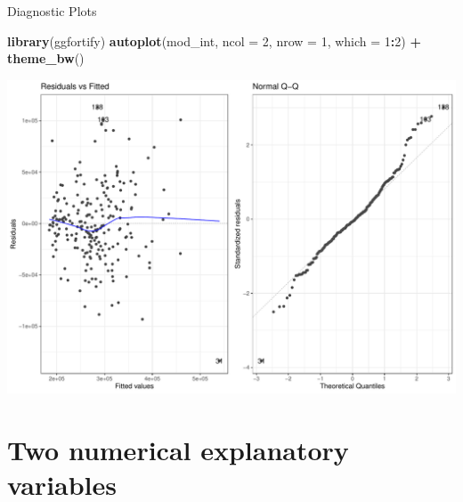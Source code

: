 \documentclass[
  ignorenonframetext,
]{beamer}
\newenvironment{Shaded}{\begin{snugshade}}{\end{snugshade}}
\newcommand{\AttributeTok}[1]{\textcolor[rgb]{0.13,0.29,0.53}{#1}}
\newcommand{\DecValTok}[1]{\textcolor[rgb]{0.00,0.00,0.81}{#1}}
\newcommand{\FunctionTok}[1]{\textcolor[rgb]{0.13,0.29,0.53}{\textbf{#1}}}
\newcommand{\NormalTok}[1]{#1}
\newcommand{\SpecialCharTok}[1]{\textcolor[rgb]{0.81,0.36,0.00}{\textbf{#1}}}
\begin{document}
\begin{frame}[fragile]{Diagnostic Plots}
\protect\hypertarget{diagnostic-plots}{}
\small

\begin{Shaded}
\begin{Highlighting}[]
\FunctionTok{library}\NormalTok{(ggfortify)}
\FunctionTok{autoplot}\NormalTok{(mod\_int, }\AttributeTok{ncol =} \DecValTok{2}\NormalTok{, }\AttributeTok{nrow =} \DecValTok{1}\NormalTok{, }\AttributeTok{which =} \DecValTok{1}\SpecialCharTok{:}\DecValTok{2}\NormalTok{) }\SpecialCharTok{+} 
  \FunctionTok{theme\_bw}\NormalTok{()}
\end{Highlighting}
\end{Shaded}

\begin{center}\includegraphics[width=0.8\linewidth,height=0.5\textheight]{Week5_Lect_files/figure-beamer/unnamed-chunk-35-1} \end{center}
\normalsize
\end{frame}

\hypertarget{two-numerical-explanatory-variables}{%
\section{Two numerical explanatory
variables}\label{two-numerical-explanatory-variables}}
\end{document}
